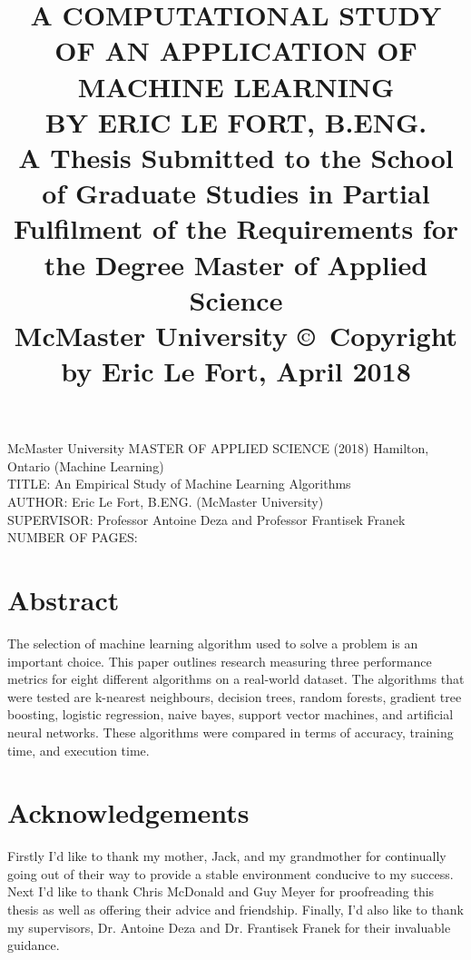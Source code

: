 \documentclass[titlepage]{article}
\title{
	A COMPUTATIONAL STUDY OF AN APPLICATION OF MACHINE LEARNING\\[20mm]
	BY ERIC LE FORT, B.ENG.\\[20mm]
	\large A Thesis Submitted to the School of Graduate Studies in Partial Fulfilment of the Requirements for the Degree Master of Applied Science\\[20mm]
	McMaster University \copyright~Copyright by Eric Le Fort, April 2018
}\date{}
\begin{document}
\maketitle\normalsize\setcounter{page}{2}
\noindent McMaster University MASTER OF APPLIED SCIENCE (2018) Hamilton, Ontario (Machine Learning)\\[10mm]
TITLE: An Empirical Study of Machine Learning Algorithms\\
AUTHOR: Eric Le Fort, B.ENG. (McMaster University)\\
SUPERVISOR: Professor Antoine Deza and Professor Frantisek Franek\\
NUMBER OF PAGES: \pageref{LastPage}



\newpage
\section{Abstract}
The selection of machine learning algorithm used to solve a problem is an important choice. This paper outlines research measuring three performance metrics for eight different algorithms on a real-world dataset. The algorithms that were tested are k-nearest neighbours, decision trees, random forests, gradient tree boosting, logistic regression, naive bayes, support vector machines, and artificial neural networks. These algorithms were compared in terms of accuracy, training time, and execution time.



\newpage
\section{Acknowledgements}
Firstly I'd like to thank my mother, Jack, and my grandmother for continually going out of their way to provide a stable environment conducive to my success. Next I'd like to thank Chris McDonald and Guy Meyer for proofreading this thesis as well as offering their advice and friendship. Finally, I'd also like to thank my supervisors, Dr. Antoine Deza and Dr. Frantisek Franek for their invaluable guidance.



\newpage
\tableofcontents
\listoftables
\listoffigures



\newpage
{}
\end{document}

